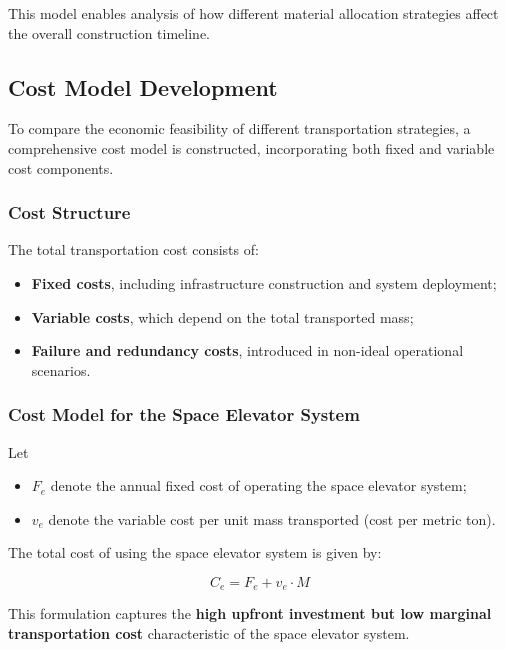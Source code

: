 \documentclass{mcmthesis}
\begin{document}
This model enables analysis of how different material allocation strategies affect the overall construction timeline.

\subsection{Cost Model Development}

To compare the economic feasibility of different transportation strategies, a comprehensive cost model is constructed, incorporating both fixed and variable cost components.

\subsubsection{Cost Structure}

The total transportation cost consists of:
\begin{itemize}
    \item \textbf{Fixed costs}, including infrastructure construction and system deployment;
    \item \textbf{Variable costs}, which depend on the total transported mass;
    \item \textbf{Failure and redundancy costs}, introduced in non-ideal operational scenarios.
\end{itemize}

\subsubsection{Cost Model for the Space Elevator System}

Let
\begin{itemize}
    \item $F_e$ denote the annual fixed cost of operating the space elevator system;
    \item $v_e$ denote the variable cost per unit mass transported (cost per metric ton).
\end{itemize}

The total cost of using the space elevator system is given by:

\[
    C_e = F_e + v_e \cdot M
\]

This formulation captures the \textbf{high upfront investment but low marginal transportation cost} characteristic of the space elevator system.
\end{document}

